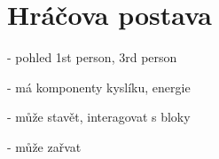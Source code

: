 
\section{Hráčova postava}

- pohled 1st person, 3rd person

- má komponenty kyslíku, energie

- může stavět, interagovat s bloky

- může zařvat
